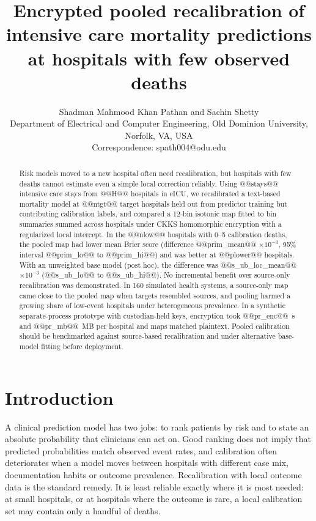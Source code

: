 \documentclass[11pt]{article}
\title{Encrypted pooled recalibration of intensive care mortality predictions at hospitals with few observed deaths}
\author{Shadman Mahmood Khan Pathan and Sachin Shetty\\
Department of Electrical and Computer Engineering, Old Dominion University, Norfolk, VA, USA\\
Correspondence: spath004@odu.edu}
\date{}
\begin{document}
\maketitle
\begin{abstract}
\noindent Risk models moved to a new hospital often need recalibration, but hospitals with few deaths cannot estimate even a simple local correction reliably. Using @@stays@@ intensive care stays from @@H@@ hospitals in eICU, we recalibrated a text-based mortality model at @@ntgt@@ target hospitals held out from predictor training but contributing calibration labels, and compared a 12-bin isotonic map fitted to bin summaries summed across hospitals under CKKS homomorphic encryption with a regularized local intercept. In the @@nlow@@ hospitals with 0--5 calibration deaths, the pooled map had lower mean Brier score (difference @@prim_mean@@ $\times10^{-3}$, 95\% interval @@prim_lo@@ to @@prim_hi@@) and was better at @@plower@@ hospitals. With an unweighted base model (post hoc), the difference was @@s_ub_loc_mean@@ $\times10^{-3}$ (@@s_ub_lo@@ to @@s_ub_hi@@). No incremental benefit over source-only recalibration was demonstrated. In 160 simulated health systems, a source-only map came close to the pooled map when targets resembled sources, and pooling harmed a growing share of low-event hospitals under heterogeneous prevalence. In a synthetic separate-process prototype with custodian-held keys, encryption took @@pr_enc@@~s and @@pr_mb@@~MB per hospital and maps matched plaintext. Pooled calibration should be benchmarked against source-based recalibration and under alternative base-model fitting before deployment.
\end{abstract}

\section*{Introduction}
A clinical prediction model has two jobs: to rank patients by risk and to state an absolute probability that clinicians can act on. Good ranking does not imply that predicted probabilities match observed event rates, and calibration often deteriorates when a model moves between hospitals with different case mix, documentation habits or outcome prevalence\cite{r3}. Recalibration with local outcome data is the standard remedy\cite{r17}. It is least reliable exactly where it is most needed: at small hospitals, or at hospitals where the outcome is rare, a local calibration set may contain only a handful of deaths.
\end{document}
